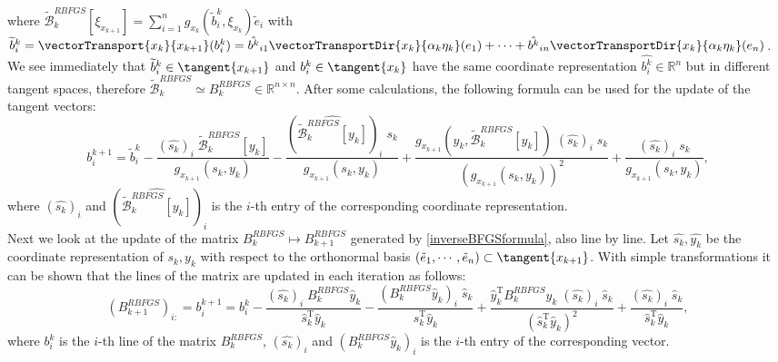 where $\widetilde{\mathcal{B}}^{RBFGS}_k [\xi_{x_{k+1}}] = \sum^{n}_{i=1} g_{x_k} (\widetilde{b}^{k}_i, \xi_{x_k}) \tilde{e}_i$ with $\widetilde{b}^{k}_i = \vectorTransport{x_k}{x_{k+1}} (b^{k}_i) = \hat{b^{k}}_{i1} \vectorTransportDir{x_k}{\alpha_k \eta_k} (e_1) + \cdots + \hat{b^{k}}_{in} \vectorTransportDir{x_k}{\alpha_k \eta_k} (e_n)$. We see immediately that $\widetilde{b}^{k}_i \in \tangent{x_{k+1}}$ and $b^{k}_i \in \tangent{x_k}$ have the same coordinate representation $\hat{b^{k}_i} \in \mathbb{R}^n$ but in different tangent spaces, therefore $\widetilde{\mathcal{B}}^{RBFGS}_k \simeq B^{RBFGS}_k \in \mathbb{R}^{n \times n}$. After some calculations, the following formula can be used for the update of the tangent vectors:
\begin{equation}\label{InverseRBFGSUpdateRows}
    b^{k+1}_{i} = \widetilde{b}^{k}_i - \frac{(\hat{s_k})_i \; \widetilde{\mathcal{B}}^{RBFGS}_k [y_k]}{g_{x_{k+1}}(s_k, y_k)} - \frac{(\widehat{\widetilde{\mathcal{B}}^{RBFGS}_k [y_k]})_i \; s_k}{g_{x_{k+1}}(s_k, y_k)} + \frac{g_{x_{k+1}}(y_k, \widetilde{\mathcal{B}}^{RBFGS}_k [y_k]) \; (\hat{s_k})_i \; s_k}{(g_{x_{k+1}}(s_k, y_k))^2} + \frac{(\hat{s_k})_i \; s_k}{g_{x_{k+1}}(s_k, y_k)},
\end{equation}
where $(\hat{s_k})_i$ and $(\widehat{\widetilde{\mathcal{B}}^{RBFGS}_k [y_k]})_i$ is the $i$-th entry of the corresponding coordinate representation. \\
Next we look at the update of the matrix $B^{RBFGS}_k \mapsto B^{RBFGS}_{k+1}$ generated by \cref{inverseBFGSformula}, also line by line. Let $\hat{s_k}, \hat{y_k}$ be the coordinate representation of $s_k, y_k$ with respect to the orthonormal basis $(\tilde{e}_1, \cdots, \tilde{e}_n) \subset \tangent{x_{k+1}}$. With simple transformations it can be shown that the lines of the matrix are updated in each iteration as follows:
\begin{equation*}
    (B^{RBFGS}_{k+1})_{i:} = b^{k+1}_i = b^{k}_i - \frac{(\hat{s_k})_i \; B^{RBFGS}_k \hat{y}_k}{\hat{s}^{\mathrm{T}}_k \hat{y}_k} - \frac{(B^{RBFGS}_k \hat{y}_k)_i \; \hat{s}_k}{\hat{s}^{\mathrm{T}}_k \hat{y}_k} + \frac{\hat{y}^{\mathrm{T}}_k B^{RBFGS}_k \hat{y}_k \; (\hat{s_k})_i \; \hat{s}_k}{(\hat{s}^{\mathrm{T}}_k \hat{y}_k)^2} + \frac{(\hat{s_k})_i \; \hat{s}_k}{\hat{s}^{\mathrm{T}}_k \hat{y}_k},
\end{equation*}
where $b^{k}_i$ is the $i$-th line of the matrix $B^{RBFGS}_k$, $(\hat{s_k})_i$ and $(B^{RBFGS}_k \hat{y}_k)_i$ is the $i$-th entry of the corresponding vector. \\
